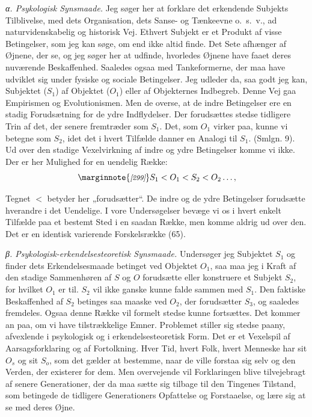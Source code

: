 \documentclass[12pt,a4paper]{book}
\newcommand{\opage}[1]{\marginnote{\footnotesize\textit{[#1]}}}
\begin{document}
\emph{α. Psykologisk Synsmaade.} Jeg søger her at forklare det erkendende Subjekts
Tilblivelse, med dets Organisation, dets Sanse- og Tænkeevne o.\ s.\ v., ad
naturvidenskabelig og historisk Vej. Ethvert Subjekt er et Produkt af visse
Betingelser, som jeg kan søge, om end ikke altid finde. Det Sete afhænger af Øjnene,
der se, og jeg søger her at udfinde, hvorledes Øjnene have faaet deres nuværende
Beskaffenhed. Saaledes ogsaa med Tankeformerne, der maa have udviklet sig under
fysiske og sociale Betingelser. Jeg udleder da, saa godt jeg kan, Subjektet ($S_1$) af
Objektet ($O_1$) eller af Objekternes Indbegreb. Denne Vej gaa Empirismen og
Evolutionismen. Men de overse, at de indre Betingelser ere en stadig Forudsætning for
de ydre Indflydelser. Der forudsættes stedse tidligere Trin af det, der senere
fremtræder som $S_1$. Det, som $O_1$ virker paa, kunne vi betegne som $S_2$, idet det
i hvert Tilfælde danner en Analogi til $S_1$. (Smlgn. 9). Ud over den stadige
Vexelvirkning af indre og ydre Betingelser komme vi ikke. Der er her Mulighed for en
uendelig Række:
\[
\opage{299}S_1 < O_1 < S_2 < O_2 \ldots, \]

Tegnet $<$ betyder her „forudsætter“. De indre og de ydre Betingelser forudsætte
hverandre i det Uendelige. I vore Undersøgelser bevæge vi os i hvert enkelt Tilfælde
paa et bestemt Sted i en saadan Række, men komme aldrig ud over den. Det er en
identisk varierende Forskelsrække (65).

\emph{β. Psykologisk-erkendelsesteoretisk Synsmaade.} Undersøger jeg Subjektet $S_1$
og finder dets Erkendelsesmaade betinget ved Objektet $O_1$, saa maa jeg i Kraft af
den stadige Sammenhøren af $S$ og $O$ forudsætte eller konstruere et Subjekt $S_2$,
for hvilket $O_1$ er til. $S_2$ vil ikke ganske kunne falde sammen med $S_1$. Den
faktiske Beskaffenhed af $S_2$ betinges saa maaske ved $O_2$, der forudsætter $S_3$,
og saaledes fremdeles. Ogsaa denne Række vil formelt stedse kunne fortsættes. Det
kommer an paa, om vi have tilstrækkelige Emner. Problemet stiller sig stedse paany,
afvexlende i psykologisk og i erkendelsesteoretisk Form. Det er et Vexelspil af
Aarsagsforklaring og af Fortolkning. Hver Tid, hvert Folk, hvert Menneske har sit
$O_s$ og sit $S_o$, som det gælder at bestemme, naar de ville forstaa sig selv og den
Verden, der existerer for dem. Men overvejende vil Forklaringen blive tilvejebragt af
senere Generationer, der da maa sætte sig tilbage til den Tingenes Tilstand, som
betingede de tidligere Generationers Opfattelse og Forstaaelse, og lære sig at se med
deres Øjne.
\end{document}
